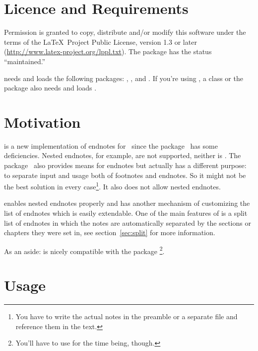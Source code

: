 \documentclass[toc=bib,toc=index]{cnpkgdoc}
\begin{document}
\section{Licence and Requirements}
Permission is granted to copy, distribute and/or modify this software under the
terms of the \LaTeX\ Project Public License, version 1.3 or later
(\url{http://www.latex-project.org/lppl.txt}). The package has the status
``maintained.''

\enotez needs and loads the following packages: ,
,  and . If you're using
, a 
class or the package  \enotez also needs and loads .

\section{Motivation}
\enotez is a new implementation of endnotes for \LaTeXe\ since the 
package~\cite{endnotes} has some deficiencies. Nested endnotes, for example, are
not supported, neither is . The  package~\cite{sepfootnotes}
also provides means for endnotes but actually has a different purpose: to
separate input and usage both of footnotes and endnotes. So it might not be the
best solution in every case\footnote{You have to write the actual notes in the
preamble or a separate file and reference them in the text.}. It also does not
allow nested endnotes.

\enotez enables nested endnotes properly and has another mechanism of customizing
the list of endnotes which is easily extendable. One of the main features  of
\enotez is a split list of endnotes in which the notes are automatically
separated by the sections or chapters they were set in, see section~\ref{sec:split}
for more information.

As an aside: \enotez is nicely compatible with the  package%
\footnote{You'll have to use  for the time being, though.}.

\section{Usage}
\end{document}
